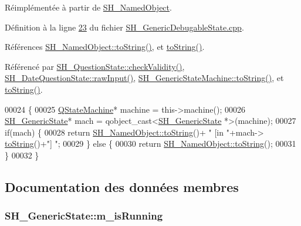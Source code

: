 Réimplémentée à partir de \hyperlink{classSH__NamedObject_a9f4b19df6a96a17daaf1060b3019ef47}{S\-H\-\_\-\-Named\-Object}.



Définition à la ligne \hyperlink{SH__GenericDebugableState_8cpp_source_l00023}{23} du fichier \hyperlink{SH__GenericDebugableState_8cpp_source}{S\-H\-\_\-\-Generic\-Debugable\-State.\-cpp}.



Références \hyperlink{classSH__NamedObject_a9f4b19df6a96a17daaf1060b3019ef47}{S\-H\-\_\-\-Named\-Object\-::to\-String()}, et \hyperlink{classSH__GenericState_a7779babbb40f3f8faa71112204d9804f}{to\-String()}.



Référencé par \hyperlink{classSH__QuestionState_a902be003650c33d954d707b2d3ee0bb9}{S\-H\-\_\-\-Question\-State\-::check\-Validity()}, \hyperlink{classSH__DateQuestionState_a71917e94cb9ce692f916a848bc8c8892}{S\-H\-\_\-\-Date\-Question\-State\-::raw\-Input()}, \hyperlink{classSH__GenericStateMachine_a85c0c1c9d258ae991f84667412fa47cd}{S\-H\-\_\-\-Generic\-State\-Machine\-::to\-String()}, et \hyperlink{classSH__GenericState_a7779babbb40f3f8faa71112204d9804f}{to\-String()}.


\begin{DoxyCode}
00024 \{
00025     \hyperlink{classQStateMachine}{QStateMachine}* machine = this->machine();
00026     \hyperlink{classSH__GenericState}{SH\_GenericState}* mach = qobject\_cast<\hyperlink{classSH__GenericState}{SH\_GenericState} *>(machine);
00027     \textcolor{keywordflow}{if}(mach) \{
00028         \textcolor{keywordflow}{return} \hyperlink{classSH__NamedObject_a9f4b19df6a96a17daaf1060b3019ef47}{SH\_NamedObject::toString}()+ \textcolor{stringliteral}{" [in "}+mach->
      \hyperlink{classSH__GenericState_a7779babbb40f3f8faa71112204d9804f}{toString}()+\textcolor{stringliteral}{"] "};
00029     \} \textcolor{keywordflow}{else} \{
00030         \textcolor{keywordflow}{return} \hyperlink{classSH__NamedObject_a9f4b19df6a96a17daaf1060b3019ef47}{SH\_NamedObject::toString}();
00031     \}
00032 \}
\end{DoxyCode}


\subsection{Documentation des données membres}
\hypertarget{classSH__GenericState_a72ddc905cfbffbed48bb2f2474d5297a}{
\subsubsection[{m\-\_\-is\-Running}]{\setlength{\rightskip}{0pt plus 5cm}S\-H\-\_\-\-Generic\-State\-::m\-\_\-is\-Running\hspace{0.3cm}{\ttfamily [private]}}}\label{classSH__GenericState_a72ddc905cfbffbed48bb2f2474d5297a}


